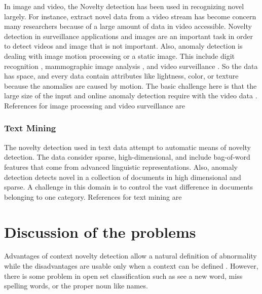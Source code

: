 \documentclass[conference]{IEEEtran}
\begin{document}
In image and video, the Novelty detection has been used in recognizing novel largely. For instance, extract novel data from a video stream has become concern many researchers because of a large amount of data in video accessible. Novelty detection in surveillance applications and images are an important task in order to detect videos and image that is not important. Also, anomaly detection is dealing with image motion processing or a static image. This include digit recognition \cite{lecun1990handwritten}, mammographic image analysis \cite{spence2001detection}, and video surveillance \cite{yeung2002parzen}. So the data has space, and every data contain attributes like lightness, color, or texture because the anomalies are caused by motion. The basic challenge here is that the large size of the input and online anomaly detection require with the video data \cite{chandola2009anomaly}. References for image processing and video surveillance are

\cite{pokrajac2007incremental}
\cite{ramezani2008fast}
\cite{singh2004approach}
\cite{markou2006neural}
\cite{yong2012novelty}
\cite{yong2013wildlife}

\subsubsection{ Text Mining}

The novelty detection used in text data attempt to automatic means of novelty detection. The data consider sparse, high-dimensional, and include bag-of-word features that come from advanced linguistic representations. Also, anomaly detection detects novel in a collection of documents in high dimensional and sparse. A challenge in this domain is to control the vast difference in documents belonging to one category. References for text mining are
\cite{ando2007clustering}
\cite{ertoz2004finding}
\cite{manevitz2007one}
\cite{zhuang2006parameter}
\cite{zhang2005probabilistic}
\cite{basu2004probabilistic}
 
\section{Discussion of the problems }

Advantages of context novelty detection allow a natural definition of abnormality while the disadvantages are usable only when a context can be defined \cite{chandola2009anomaly}. However, there is some problem in open set classification such as see a new word, miss spelling words, or the proper noun like names. 
\end{document}
